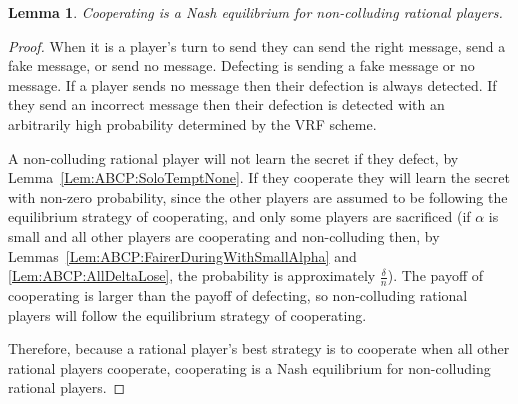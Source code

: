 \documentclass[12pt]{dalcsthesis}
\newtheorem{lemma}{Lemma}
\begin{document}
\begin{lemma}Cooperating is a Nash equilibrium for non-colluding rational players.\end{lemma}
\begin{proof}
When it is a player's turn to send they can send the right message, send a fake message, or send no message. Defecting is sending a fake message or no message. If a player sends no message then their defection is always detected. If they send an incorrect message then their defection is detected with an arbitrarily high probability determined by the VRF scheme.

A non-colluding rational player will not learn the secret if they defect, by Lemma~\ref{Lem:ABCP:SoloTemptNone}. If they cooperate they will learn the secret with non-zero probability, since the other players are assumed to be following the equilibrium strategy of cooperating, and only some players are sacrificed (if $\alpha$ is small and all other players are cooperating and non-colluding then, by Lemmas~\ref{Lem:ABCP:FairerDuringWithSmallAlpha} and \ref{Lem:ABCP:AllDeltaLose}, the probability is approximately $\frac{\delta}{n}$). The payoff of cooperating is larger than the payoff of defecting, so non-colluding rational players will follow the equilibrium strategy of cooperating.

Therefore, because a rational player's best strategy is to cooperate when all other rational players cooperate, cooperating is a Nash equilibrium for non-colluding rational players. 
\end{proof}
\end{document}
